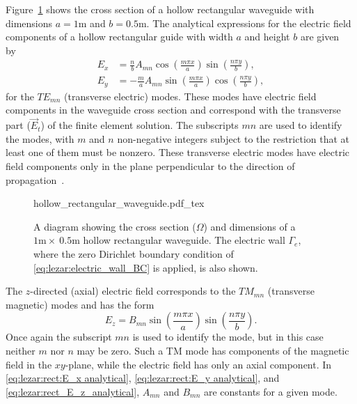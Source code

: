 Figure~\ref{fig:lezar:hollow_rectangular_guide} shows the cross
section of a hollow rectangular waveguide with dimensions
$a = 1\text{m}$ and $b = 0.5\text{m}$.
The analytical expressions for the electric field
components of a hollow rectangular guide with width $a$ and height $b$
are given by~\citep{Pozar2005}
\begin{align}
    \label{eq:lezar:rect:E_x analytical}
    E_x &= \frac{n}{b}A_{mn}\cos\left(\frac{m\pi
    x}{a}\right)\sin\left(\frac{n\pi y}{b}\right),\\
    \label{eq:lezar:rect:E_y analytical}
    E_y &= -\frac{m}{a}A_{mn}\sin\left(\frac{m\pi x}{a}\right)\cos\left(\frac{n\pi y}{b}\right),
\end{align}
for the $TE_{mn}$ (transverse electric) modes. These modes have
electric field components in the waveguide cross section and
correspond with the transverse part ($\vec{E}_t$) of the finite
element solution. The subscripts $mn$ are used to identify the modes,
with $m$ and $n$ non-negative integers subject to the restriction that
at least one of them must be nonzero. These transverse electric modes
have electric field components only in the plane perpendicular to the
direction of propagation~\citep{Pozar2005}.

\begin{figure}
    \centering
    \def\svgwidth{\smallfig}
    {hollow_rectangular_waveguide.pdf_tex}
    \caption{A diagram showing the cross section ($\Omega$) and dimensions
    of a $1\text{m}\times~0.5\text{m}$ hollow rectangular waveguide.
    The electric wall $\Gamma_e$, where the zero Dirichlet
    boundary condition of \eqref{eq:lezar:electric_wall_BC} is applied, is also shown.}
    \label{fig:lezar:hollow_rectangular_guide}
\end{figure}

The $z$-directed (axial) electric field corresponds to the $TM_{mn}$
(transverse magnetic) modes and has the form~\citep{Pozar2005}
\begin{equation}
 \label{eq:lezar:rect_E_z_analytical}
 E_z = B_{mn}\sin\left(\frac{m\pi x}{a}\right)\sin\left(\frac{n\pi y}{b}\right).
\end{equation}
Once again the subscript $mn$ is used to identify the mode, but in
this case neither $m$ nor $n$ may be zero. Such a TM mode has
components of the magnetic field in the $xy$-plane, while the electric
field has only an axial component. In \eqref{eq:lezar:rect:E_x
analytical}, \eqref{eq:lezar:rect:E_y analytical},
and \eqref{eq:lezar:rect_E_z_analytical}, $A_{mn}$ and $B_{mn}$ are
constants for a given mode.


